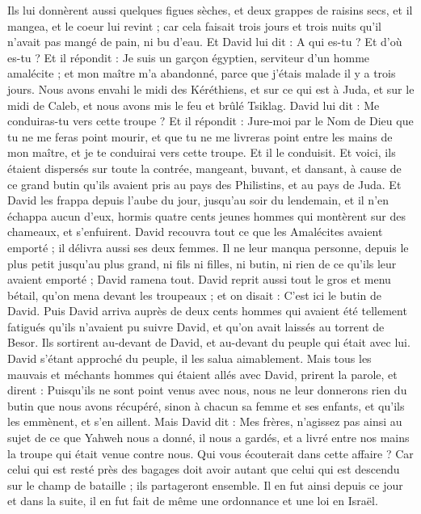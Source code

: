 \begin{multicols}{2}
Ils lui donnèrent aussi quelques figues sèches, et deux grappes de raisins secs, et il mangea, et le coeur lui revint ; car cela faisait trois jours et trois nuits qu’il n’avait pas mangé de pain, ni bu d’eau.
Et David lui dit : A qui es-tu ? Et d’où es-tu ? Et il répondit : Je suis un garçon égyptien, serviteur d’un homme amalécite ; et mon maître m’a abandonné, parce que j’étais malade il y a trois jours.
Nous avons envahi le midi des Kéréthiens, et sur ce qui est à Juda, et sur le midi de Caleb, et nous avons mis le feu et brûlé Tsiklag.
David lui dit : Me conduiras-tu vers cette troupe ? Et il répondit : Jure-moi par le Nom de Dieu que tu ne me feras point mourir, et que tu ne me livreras point entre les mains de mon maître, et je te conduirai vers cette troupe.
Et il le conduisit. Et voici, ils étaient dispersés sur toute la contrée, mangeant, buvant, et dansant, à cause de ce grand butin qu’ils avaient pris au pays des Philistins, et au pays de Juda.
Et David les frappa depuis l’aube du jour, jusqu’au soir du lendemain, et il n’en échappa aucun d’eux, hormis quatre cents jeunes hommes qui montèrent sur des chameaux, et s’enfuirent.
David recouvra tout ce que les Amalécites avaient emporté ; il délivra aussi ses deux femmes.
Il ne leur manqua personne, depuis le plus petit jusqu’au plus grand, ni fils ni filles, ni butin, ni rien de ce qu’ils leur avaient emporté ; David ramena tout.
David reprit aussi tout le gros et menu bétail, qu’on mena devant les troupeaux ; et on disait : C’est ici le butin de David.
Puis David arriva auprès de deux cents hommes qui avaient été tellement fatigués qu’ils n’avaient pu suivre David, et qu’on avait laissés au torrent de Besor. Ils sortirent au-devant de David, et au-devant du peuple qui était avec lui. David s’étant approché du peuple, il les salua aimablement.
Mais tous les mauvais et méchants hommes qui étaient allés avec David, prirent la parole, et dirent : Puisqu’ils ne sont point venus avec nous, nous ne leur donnerons rien du butin que nous avons récupéré, sinon à chacun sa femme et ses enfants, et qu’ils les emmènent, et s’en aillent.
Mais David dit : Mes frères, n’agissez pas ainsi au sujet de ce que Yahweh nous a donné, il nous a gardés, et a livré entre nos mains la troupe qui était venue contre nous.
Qui vous écouterait dans cette affaire ? Car celui qui est resté près des bagages doit avoir autant que celui qui est descendu sur le champ de bataille ; ils partageront ensemble.
Il en fut ainsi depuis ce jour et dans la suite, il en fut fait de même une ordonnance et une loi en Israël.

\end{multicols}
